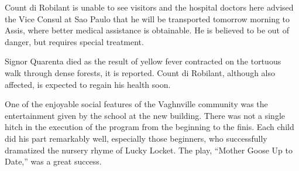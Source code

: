 \documentclass{newspaper1920}
\begin{document}
\begin{multicols}{3}
Count di Robilant is unable to see visitors and the hospital doctors
here advised the Vice Consul at Sao Paulo that he will be transported
tomorrow morning to Assis, where better medical assistance is
obtainable.  He is believed to be out of danger, but requires special
treatment.

Signor Quarenta died as the result of yellow fever contracted on the
tortuous walk through dense forests, it is reported.  Count di
Robilant, although also affected, is expected to regain his health
soon.

\fullrule


\noindent
One of the enjoyable social features of the Vaghnville community was
the entertainment given by the school at the new building.  There was
not a single hitch in the execution of the program from the beginning
to the finis.  Each child did his part remarkably well, especially
those beginners, who successfully dramatized the nursery rhyme of
Lucky Locket.  The play, ``Mother Goose Up to Date,'' was a great
success.

\end{multicols}
\end{document}
